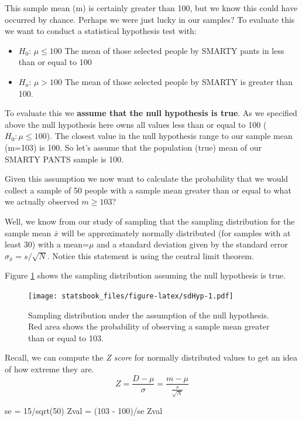 \documentclass[
]{book}
\newenvironment{Shaded}{\begin{snugshade}}{\end{snugshade}}
\newcommand{\DecValTok}[1]{\textcolor[rgb]{0.00,0.00,0.81}{#1}}
\newcommand{\FunctionTok}[1]{\textcolor[rgb]{0.00,0.00,0.00}{#1}}
\newcommand{\NormalTok}[1]{#1}
\newcommand{\OtherTok}[1]{\textcolor[rgb]{0.56,0.35,0.01}{#1}}
\newcommand{\SpecialCharTok}[1]{\textcolor[rgb]{0.00,0.00,0.00}{#1}}
\providecommand{\tightlist}{%
  \setlength{\itemsep}{0pt}\setlength{\parskip}{0pt}}
\theoremstyle{definition}
\theoremstyle{definition}
\theoremstyle{definition}
\theoremstyle{definition}
\theoremstyle{remark}
\begin{document}
This sample mean (m) is certainly greater than 100, but we know this could have occurred by chance. Perhaps we were just lucky in our samples? To evaluate this we want to conduct a statistical hypothesis test with:

\begin{itemize}
\tightlist
\item
  \(H_0\): \(\mu \leq 100\) The mean of those selected people by SMARTY pants in less than or equal to 100
\item
  \(H_a\): \(\mu > 100\) The mean of those selected people by SMARTY is greater than 100.
\end{itemize}

To evaluate this we \textbf{assume that the null hypothesis is true}. As we specified above the null hypothesis here owns all values less than or equal to 100 ( \(H_0:\mu \leq 100\)). The closest value in the null hypothesis range to our sample mean (m=103) is 100. So let's assume that the population (true) mean of our SMARTY PANTS sample is 100.

Given this assumption we now want to calculate the probability that we would collect a sample of 50 people with a sample mean greater than or equal to what we actually observed \(m \geq 103\)?

Well, we know from our study of sampling that the sampling distribution for the sample mean \(\bar{x}\) will be approximately normally distributed (for samples with at least 30) with a mean=\(\mu\) and a standard deviation given by the standard error \(\sigma_{\bar{x}}=s/\sqrt{N}\). Notice this statement is using the central limit theorem.

Figure \ref{fig:sdHyp} shows the sampling distribution assuming the null hypothesis is true.

\begin{figure}
\centering
\texttt{[image: statsbook\_files/figure-latex/sdHyp-1.pdf]}
\caption{\label{fig:sdHyp}Sampling distribution under the assumption of the null hypothesis. Red area shows the probability of observing a sample mean greater than or equal to 103.}
\end{figure}

Recall, we can compute the \emph{Z score} for normally distributed values to get an idea of how extreme they are.
\[Z=\frac{D-\mu}{\sigma}=\frac{m-\mu}{\frac{s}{\sqrt{N}}}\]

\begin{Shaded}
\begin{Highlighting}[]
\NormalTok{se }\OtherTok{=} \DecValTok{15}\SpecialCharTok{/}\FunctionTok{sqrt}\NormalTok{(}\DecValTok{50}\NormalTok{)}
\NormalTok{Zval }\OtherTok{=}\NormalTok{ (}\DecValTok{103} \SpecialCharTok{{-}} \DecValTok{100}\NormalTok{)}\SpecialCharTok{/}\NormalTok{se}
\NormalTok{Zval}
\end{Highlighting}
\end{Shaded}
\end{document}
